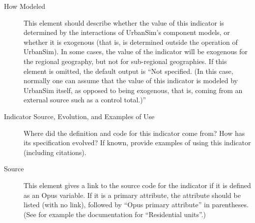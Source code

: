 \begin{description}
\item[How Modeled]
This element should describe whether the value of this indicator is
determined by the interactions of UrbanSim's component models, \modelsindex or whether
it is exogenous (that is, is determined outside the operation of UrbanSim).
In some cases, the value of the indicator will be exogenous for the
regional geography, but not for sub-regional geographies.  If this element
is omitted, the default output is ``Not specified.  (In this case,
normally one can assume that the value of this indicator is modeled by
UrbanSim itself, as opposed to being exogenous, that is, coming from an
external source such as a control total.)''

\item[Indicator Source, Evolution, and Examples of Use]
Where did the definition and code for this indicator come from?  How
has its specification evolved?  If known, provide examples of using this
indicator (including citations).

\item[Source] This element gives a link to the source code for the
indicator if it is defined as an Opus variable.  If it is a primary
attribute, the attribute should be listed (with no link), followed by
``Opus primary attribute'' in parentheses.  (See for example the
documentation for ``Residential units''.)

\end{description}
